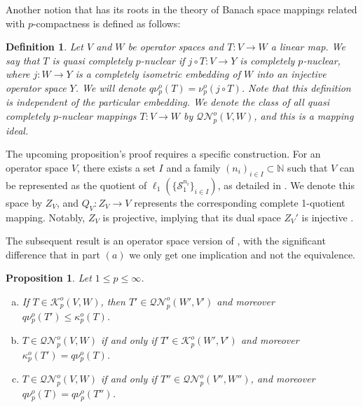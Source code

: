 \documentclass[11pt]{amsart}
\newtheorem{definition}[theorem]{Definition}
\newtheorem{proposition}[theorem]{Proposition}
\numberwithin{equation}{section}
\begin{document}
Another notion that has its roots in the theory of Banach space mappings related with $p$-compactness is defined as follows:


\begin{definition}\label{defn-quasi-completely-p-nuclear}
Let $V$ and $W$ be operator spaces and $T : V \to W$ a linear map.
We say that $T$ is \emph{quasi completely $p$-nuclear} if $j \circ T : V \to Y$ is completely $p$-nuclear, where $j : W \to Y$ is a completely isometric embedding of $W$ into an injective operator space $Y$. We will denote $q\nu^o_p(T) = \nu^o_p(j \circ T)$.
Note that this definition is independent of the particular embedding.
We denote the class of all quasi completely $p$-nuclear mappings $T:V \to W$ by $\mathcal{QN}^o_p(V,W)$,  and this is a mapping ideal.
\end{definition}

The upcoming proposition's proof requires a specific construction. For an operator space $V$, there exists a set $I$ and a family $(n_i)_{i \in I} \subset \mathbb{N}$ such that $V$ can be represented as the quotient of  $\ell_1(\{\mathcal{S}_1^{n_i} \}_{i \in I})$, as detailed in \cite[Prop. 2.12.2]{Pisier-OS-theory}. We denote this space by $Z_V$, and $Q_V : Z_V \rightarrow V$ represents the corresponding complete 1-quotient mapping. Notably, $Z_V$ is projective, implying that its dual space $Z_V'$ is injective \cite[Chapter 24]{Pisier-OS-theory}.

The subsequent result is an operator space version of \cite[Cor. 3.4 and Prop. 3.8]{Delgado-Pineiro-Serrano-adjoints}, with the significant difference that in part $(a)$ we only get one implication and not the equivalence.

\begin{proposition}\label{prop:adjoint-of-p-compact}
Let $1 \le p \le \infty$.
\begin{enumerate}[(a)]
\item If $T \in \mathcal{K}^o_p(V,W)$, then $T' \in \mathcal{QN}^o_p(W',V')$ and moreover $q\nu^o_p(T') \le \kappa^o_p(T)$.
\item $T \in \mathcal{QN}^o_p(V,W)$ if and only if $T' \in \mathcal{K}^o_p(W',V')$ and moreover $\kappa^o_p(T') = q\nu_p^o(T)$.
\item $T \in \mathcal{QN}^o_p(V,W)$ if and only if $T'' \in \mathcal{QN}^o_p(V'',W'')$, and moreover $q\nu_p^o(T) = q\nu_p^o(T'')$.
\end{enumerate}

\end{proposition}
\end{document}
